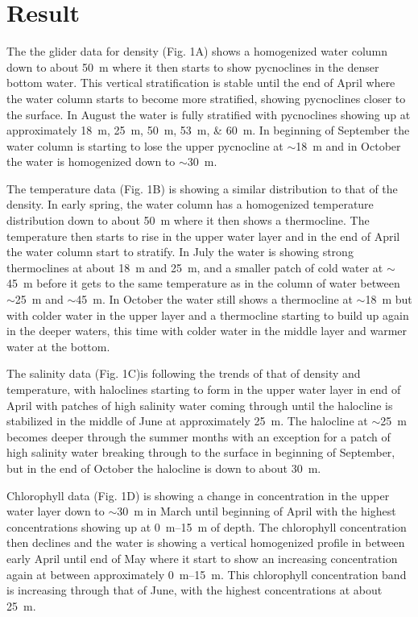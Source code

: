 \documentclass[../Main.tex]{subfiles}
\begin{document}
\section*{\crule[blue]{.3cm}{.3cm} Result}
The the glider data for density (Fig. 1A) shows a homogenized water column down to about \SI{50}{\metre} where it then starts to show pycnoclines in the denser bottom water.
 This vertical stratification is stable until the end of April where the water column starts to become more stratified, showing pycnoclines closer to the surface.
In August the water is fully stratified with pycnoclines showing up at approximately \SIlist{18;25;50;53;60}{\metre}. 
In beginning of September the water column is starting to lose the upper pycnocline at $\sim$\SI{18}{\metre} and in October the water is homogenized down to $\sim$\SI{30}{\metre}.

The temperature data (Fig. 1B) is showing a similar distribution to that of the density. 
In early spring, the water column has a homogenized temperature distribution down to about \SI{50}{\metre} where it then shows a thermocline. 
The temperature then starts to rise in the upper water layer and in the end of April the water column start to stratify. 
In July the water is showing strong thermoclines at about \SI{18}{\metre} and \SI{25}{\metre}, and a smaller patch of cold water at $\sim$\SI{45}{\metre} before it gets to the same temperature as in the column of water between $\sim$\SI{25}{\metre} and $\sim$\SI{45}{\metre}. 
In October the water still shows a thermocline at $\sim$\SI{18}{\metre} but with colder water in the upper layer and a thermocline starting to build up again in the deeper waters, this time with colder water in the middle layer and warmer water at the bottom. 

The salinity data (Fig. 1C)is following the trends of that of density and temperature, with haloclines starting to form in the upper water layer in end of April with patches of high salinity water coming through until the halocline is stabilized in the middle of June at approximately \SI{25}{\metre}. 
The halocline at $\sim$\SI{25}{\metre} becomes deeper through the summer months with an exception for a patch of high salinity water breaking through to the surface in beginning of September, but in the end of October the halocline is down to about \SI{30}{\metre}. 

Chlorophyll data (Fig. 1D) is showing a change in concentration in the upper water layer down to $\sim$\SI{30}{\metre} in March until beginning of April with the highest concentrations showing up at \SIrange{0}{15}{\metre} of depth. 
The chlorophyll concentration then declines and the water is showing a vertical homogenized profile in between early April until end of May where it start to show an increasing concentration again at between approximately \SIrange{0}{15}{\metre}. 
This chlorophyll concentration band is increasing through that of June, with the highest concentrations at about \SI{25}{\metre}.
\end{document}
